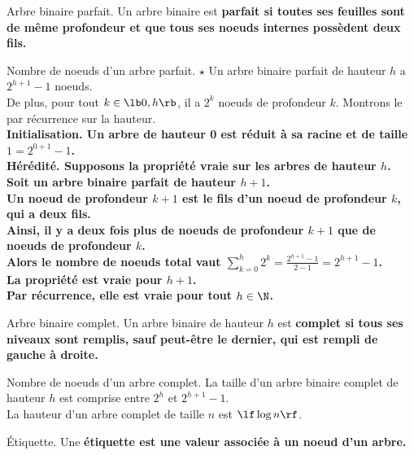 \documentclass[french, 11pt]{article}
\begin{document}
\begin{defi}{Arbre binaire parfait.}{}
    Un arbre binaire est \bf{parfait} si toutes ses feuilles sont de même profondeur et que tous ses noeuds internes possèdent deux fils.
\end{defi}

\begin{prop}{Nombre de noeuds d'un arbre parfait. $\star$}{}
    Un arbre binaire parfait de hauteur $h$ a $2^{h+1}-1$ noeuds.\\
    De plus, pour tout $k\in\lb0,h\rb$, il a $2^k$ noeuds de profondeur $k$.
    \tcblower
    Montrons le par récurrence sur la hauteur.\\
    \bf{Initialisation.} Un arbre de hauteur 0 est réduit à sa racine et de taille $1=2^{0+1}-1$.\\
    \bf{Hérédité.} Supposons la propriété vraie sur les arbres de hauteur $h$.\\
    Soit un arbre binaire parfait de hauteur $h+1$.\\
    Un noeud de profondeur $k+1$ est le fils d'un noeud de profondeur $k$, qui a deux fils.\\
    Ainsi, il y a deux fois plus de noeuds de profondeur $k+1$ que de noeuds de profondeur $k$.\\
    Alors le nombre de noeuds total vaut $\sum_{k=0}^h2^k=\frac{2^{h+1}-1}{2-1}=2^{h+1}-1$.\\
    La propriété est vraie pour $h+1$.\\
    Par récurrence, elle est vraie pour tout $h\in\N$.
\end{prop}

\begin{defi}{Arbre binaire complet.}{}
    Un arbre binaire de hauteur $h$ est \bf{complet} si tous ses niveaux sont remplis, sauf peut-être le dernier, qui est rempli de gauche à droite.
\end{defi}

\begin{corr}{Nombre de noeuds d'un arbre complet.}{}
    La taille d'un arbre binaire complet de hauteur $h$ est comprise entre $2^h$ et $2^{h+1}-1$.\\
    La hauteur d'un arbre complet de taille $n$ est $\lf\log n\rf$.
\end{corr}

\begin{defi}{Étiquette.}{}
    Une \bf{étiquette} est une valeur associée à un noeud d'un arbre.
\end{defi}
\end{document}

